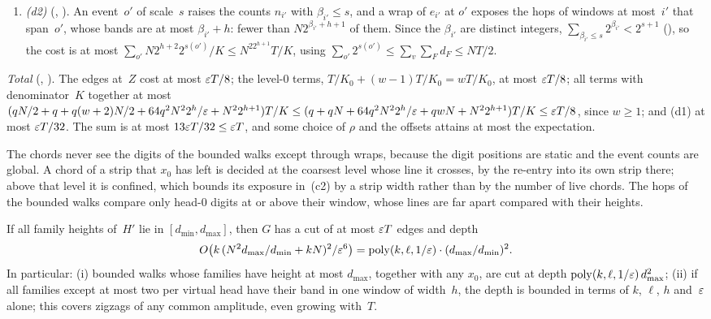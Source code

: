 \begin{outline}
\begin{enumerate}[label=(\alph*),leftmargin=2em]
The hops of window~$i$ that span~$\tau$ lie in families of band at most $\beta_i+h$, so by the overlap bound of
\cref{lem:families} () there are fewer than $N2^{\beta_i+h+1}$ of them. There are $T/W_i\le
T/\mathrm{lo}_i$ visits to level-$i$ lines in expectation, so the cost is at most
$\sum_iN2^{\beta_i+h+1}T/\mathrm{lo}_i=\eps T/32$ (for $N\ge1$; without bounded walks there is nothing to charge).
\item \emph{(d2)} (, ). An event~$o'$ of scale~$s$ raises the counts $n_{i'}$ with
$\beta_{i'}\le s$, and a wrap of $e_{i'}$ at $o'$ exposes the hops of windows at most~$i'$ that span~$o'$, whose bands are
at most $\beta_{i'}+h$: fewer than $N2^{\beta_{i'}+h+1}$ of them. Since the $\beta_{i'}$ are distinct integers,
$\sum_{\beta_{i'}\le s}2^{\beta_{i'}}<2^{s+1}$ (), so the cost is at most
$\sum_{o'}N2^{h+2}2^{s(o')}/K\le N^22^{h+1}T/K$, using $\sum_{o'}2^{s(o')}\le\sum_v\sum_Fd_F\le NT/2$.
\end{enumerate}
\emph{Total} (, ). The edges at~$Z$ cost at most $\varepsilon T/8$; the level-$0$ terms,
$T/K_0+(w-1)T/K_0=wT/K_0$, at most $\varepsilon T/8$; all terms with denominator~$K$ together at most
$(qN/2+q+q(w+2)N/2+64q^2N^22^h/\varepsilon+N^22^{h+1})T/K\le(q+qN+64q^2N^22^h/\varepsilon+qwN+N^22^{h+1})T/K\le\varepsilon T/8$, since
$w\ge1$; and (d1) at most $\varepsilon T/32$. The sum is at most $13\varepsilon T/32\le\varepsilon T$, and some choice of $\rho$ and the offsets
attains at most the expectation.
\end{outline}

The chords never see the digits of the bounded walks except through wraps, because the digit positions are static and the
event counts are global. A chord of a strip that $x_0$ has left is decided at the coarsest level whose line it crosses, by
the re-entry into its own strip there; above that level it is confined, which bounds its exposure in~(c2) by a strip
width rather than by the number of live chords. The hops of the bounded walks compare only head-$0$ digits at or above
their window, whose lines are far apart compared with their heights.

\begin{corollary}\label{cor:M1}
If all family heights of~$H'$ lie in $[d_{\min},d_{\max}]$, then $G$ has a cut of at most $\varepsilon T$ edges and depth
\[
  O\bigl(k\,(N^2d_{\max}/d_{\min}+kN)^2/\varepsilon^6\bigr)=\operatorname{poly}(k,\ell,1/\varepsilon)\cdot(d_{\max}/d_{\min})^2 .
\]
In particular: (i) bounded walks whose families have height at most $d_{\max}$, together with any $x_0$, are cut at depth
$\operatorname{poly}(k,\ell,1/\varepsilon)\,d_{\max}^2$; (ii) if all families except at most two per virtual head have their band in one window of
width~$h$, the depth is bounded in terms of $k$, $\ell$, $h$ and~$\varepsilon$ alone; this covers zigzags of any common
amplitude, even growing with~$T$.
\end{corollary}

